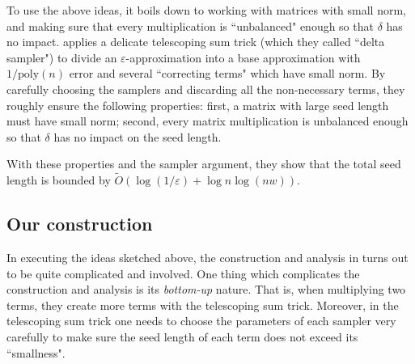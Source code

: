 \documentclass[10pt,a4paper]{article}
\newcommand{\eps}{\varepsilon}
\newcommand{\poly}{\mathrm{poly}}
\begin{document}
To use the above ideas, it boils down to working with matrices with small norm, and  making sure that every multiplication is ``unbalanced" enough so that $\delta$ has no impact. \cite{BCG18} applies a delicate telescoping sum trick (which they called ``delta sampler") to divide an $\eps$-approximation into a base approximation with $1/\poly(n)$ error and several ``correcting terms" which have small norm. By carefully choosing the samplers and discarding all the non-necessary terms,  they roughly ensure the following properties: first, a matrix with large seed length must have small norm; second, every matrix multiplication is unbalanced enough so that $\delta$ has no impact on the seed length. 


With these properties and the sampler argument, they show that the total seed length is bounded by $\tilde{O}(\log(1/\eps)+\log n \log(nw))$.

\subsection{Our construction}\label{sec:our-const}
In executing the ideas sketched above,  the construction and analysis in \cite{BCG18} turns out to be quite complicated and involved. One thing which complicates the construction and analysis is its \emph{bottom-up} nature. That is, when multiplying two terms, they create more terms with the telescoping sum trick. Moreover, in the telescoping sum trick one needs to choose the parameters of each sampler very carefully to make sure the seed length of each term does not exceed its ``smallness". 
\end{document}
